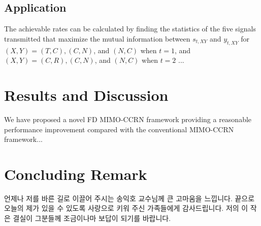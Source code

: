 \documentclass[master,english,final]{kaist-ucs}
\begin{document}
\section{Application}

The achievable rates can be calculated by finding the statistics of the five signals transmitted that maximize the mutual information between $s_{t,XY}$ and $y_{t,XY}$ for $(X,Y)=(T,C), (C,N)$, and $(N,C)$ when $t=1$, and $(X,Y)=(C,R), (C,N)$, and $(N,C)$ when $t=2$ \cite{SOCA2,EF2}...


\chapter{Results and Discussion}

We have proposed a novel FD MIMO-CCRN framework providing a reasonable performance improvement compared with the conventional MIMO-CCRN framework...

\chapter{Concluding Remark}






\acknowledgment[4]
언제나 저를 바른 길로 이끌어 주시는 송익호 교수님께 큰 고마움을 느낍니다.
끝으로 오늘의 제가 있을 수 있도록 사랑으로 키워 주신 가족들에게 감사드립니다.
저의 이 작은 결실이 그분들께 조금이나마 보답이 되기를 바랍니다.

\curriculumvitae[4]

\begin{personaldata}
    \address    {...}
\end{personaldata}
\end{document}
